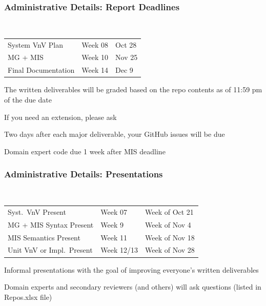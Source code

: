 \documentclass[t,12pt,numbers,fleqn]{beamer}
\begin{document}
\begin{frame}
\frametitle{Administrative Details: Report Deadlines}
~\newline
\begin{tabular}{l l l}
System VnV Plan & Week 08 & Oct 28\\
MG + MIS & Week 10 & Nov 25\\
Final Documentation & Week 14 & Dec 9\\
\end {tabular}

\bi
\item The written deliverables will be graded based on the repo contents as of
11:59 pm of the due date
\item If you need an extension, please ask
\item Two days after each major deliverable, your GitHub issues will be due
\item Domain expert code due 1 week after MIS deadline
\ei

\end{frame}


\begin{frame}
\frametitle{Administrative Details: Presentations}

~\newline
\begin{tabular}{l l l}
Syst.\ VnV Present & Week 07 & Week of Oct 21\\
MG + MIS Syntax Present & Week 9 & Week of Nov 4\\
MIS Semantics Present & Week 11 & Week of Nov 18\\
Unit VnV or Impl.\ Present & Week 12/13 & Week of Nov 28\\
\end {tabular}

\bi
\item Informal presentations with the goal of improving everyone's written
  deliverables
\item Domain experts and secondary reviewers (and others) will ask questions
  (listed in Repos.xlsx file)
\ei

\end{frame}

\end{document}
